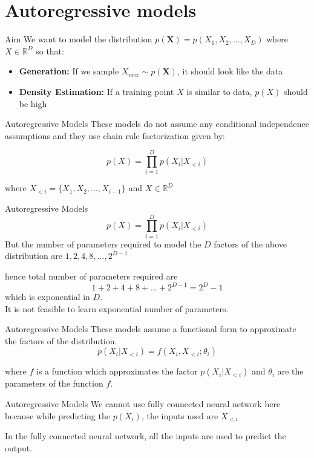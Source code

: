 \section*{Autoregressive models}
\begin{frame}{Aim}
    We want to model the distribution $p(\textbf{X}) = p(X_1,X_2,...,X_D)$ where $X \in \mathbb{R}^D$ so that:
    \begin{itemize}
        \item \textbf{Generation:} If we sample $X_{new} \sim p(\textbf{X})$, it should look like the data 
        \item \textbf{Density Estimation:} If a training point $X$ is similar to data, $p(X)$ should be high
    \end{itemize}
\end{frame}

\begin{frame}{Autoregressive Models}
    These models do not assume any conditional independence assumptions and they use chain rule factorization given by:
    
    \bigskip

    \[\boxed{p(X) = \prod_{i=1}^{D} p(X_i|X_{<i})}\] 
    
    \bigskip

    where $X_{<i} = \{X_1,X_2,...,X_{i-1}\}$ and $X \in \mathbb{R}^D$
\end{frame}

\begin{frame}{Autoregressive Models}
    \[\boxed{p(X) = \prod_{i=1}^{D} p(X_i|X_{<i})}\]
    But the number of parameters required to model the $D$ factors of the above distribution are $1,2,4,8,...,2^{D-1}$ 

    \bigskip

    hence total number of parameters required are \[\boxed{1+2+4+8+...+2^{D-1} = 2^D - 1}\] which is exponential in $D$. \\
    It is not feasible to learn exponential number of parameters.
\end{frame}

\begin{frame}{Autoregressive Models}
    These models assume a functional form to approximate the factors of the distribution. \\
    \[p(X_i|X_{<i}) = f(X_i,X_{<i};\theta_i)\]

    where $f$ is a function which approximates the factor $p(X_i|X_{<i})$ and $\theta_i$ are the parameters of the function $f$.
\end{frame}

\begin{frame}{Autoregressive Models}
    We cannot use fully connected neural network here because while predicting the $p(X_i)$, the inputs used are $X_{<i}$ \\

    \bigskip
    
    In the fully connected neural network, all the inputs are used to predict the output. \\
\end{frame}
